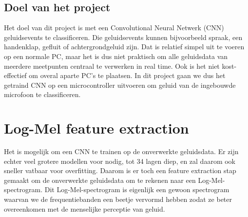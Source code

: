 \subsection{Doel van het project}

Het doel van dit project is met een Convolutional Neural Netwerk (CNN) geluidsevents te classificeren.
Die geluidsevents kunnen bijvoorbeeld spraak, een handenklap, gefluit of achtergrondgeluid zijn.
Dat is relatief simpel uit te voeren op een normale PC, maar het is dus niet praktisch om alle geluidsdata van meerdere meetpunten centraal te verwerken in real time.
Ook is het niet kost-effectief om overal aparte PC's te plaatsen. In dit project gaan we dus het getraind CNN op een microcontroller uitvoeren om geluid van de ingebouwde microfoon te classificeren.

\section{Log-Mel feature extraction}

Het is mogelijk om een CNN te trainen op de onverwerkte geluidsdata.
Er zijn echter veel grotere modellen voor nodig, tot 34 lagen diep, en zal daarom ook sneller vatbaar voor overfitting. \cite{IEEE:very-deep-cnn-raw-waveforms}
Daarom is er toch een feature extraction stap gemaakt om de onverwerkte geluidsdata om te rekenen naar een Log-Mel-spectrogram.
Dit Log-Mel-spectrogram is eigenlijk een gewoon spectrogram waarvan we de frequentiebanden een beetje vervormd hebben zodat ze beter overeenkomen met de menselijke perceptie van geluid. \cite{enwiki:Mel-freq-cepstrum}

